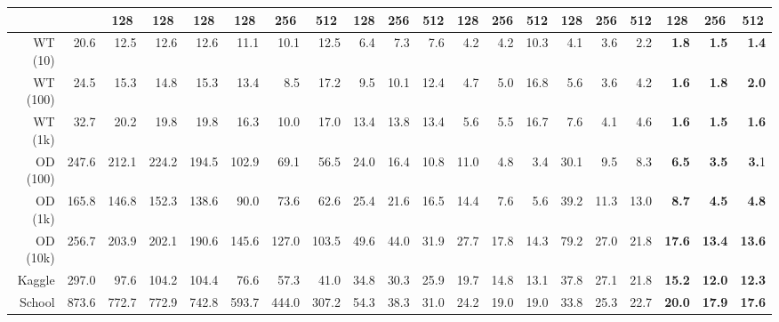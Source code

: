 \begin{table*}[]
\begin{tabular}{r|r|r|r|r|rrr|rrr|rrr|rrr|rrr}
&&\multicolumn{1}{c|}{\textbf{128}}&\multicolumn{1}{c|}{\textbf{128}}&\multicolumn{1}{c|}{\textbf{128}}&\multicolumn{1}{c}{\textbf{128}}&\multicolumn{1}{c}{\textbf{256}}&\multicolumn{1}{c|}{\textbf{512}}&\multicolumn{1}{c}{\textbf{128}}&\multicolumn{1}{c}{\textbf{256}}&\multicolumn{1}{c|}{\textbf{512}}&\multicolumn{1}{c}{\textbf{128}}&\multicolumn{1}{c}{\textbf{256}}&\multicolumn{1}{c|}{\textbf{512}}&\multicolumn{1}{c}{\textbf{128}}&\multicolumn{1}{c}{\textbf{256}}&\multicolumn{1}{c|}{\textbf{512}}&\multicolumn{1}{c}{\textbf{128}}&\multicolumn{1}{c}{\textbf{256}}&\multicolumn{1}{c}{\textbf{512}}\\
\toprule
WT (10) & 20.6 & 12.5 & 12.6 & 12.6 & 11.1 & 10.1 & \colorbox[HTML]{A2EDFF}{12.5} & 6.4 & \colorbox[HTML]{A2EDFF}{7.3} & \colorbox[HTML]{A2EDFF}{7.6} & 4.2 & 4.2 & \colorbox[HTML]{A2EDFF}{10.3} & 4.1 & 3.6 & 2.2 & \textbf{1.8} & \textbf{1.5} & \textbf{1.4} \\
WT (100) & 24.5 & 15.3 & 14.8 & 15.3 & 13.4 & 8.5 & \colorbox[HTML]{A2EDFF}{17.2} & 9.5 & \colorbox[HTML]{A2EDFF}{10.1} & \colorbox[HTML]{A2EDFF}{12.4} & 4.7 & \colorbox[HTML]{A2EDFF}{5.0} & \colorbox[HTML]{A2EDFF}{16.8} & 5.6 & 3.6 & \colorbox[HTML]{A2EDFF}{4.2} & \textbf{1.6} & \colorbox[HTML]{A2EDFF}{\textbf{1.8}} & \colorbox[HTML]{A2EDFF}{\textbf{2.0}}\\
WT (1k) & 32.7 & 20.2 & 19.8 & 19.8 & 16.3 & 10.0 & \colorbox[HTML]{A2EDFF}{17.0} & 13.4 & \colorbox[HTML]{A2EDFF}{13.8} & 13.4 & 5.6 & 5.5 & \colorbox[HTML]{FFABA8}{16.7} & 7.6 & 4.1 & \colorbox[HTML]{A2EDFF}{4.6} & \textbf{1.6} & \textbf{1.5} & \colorbox[HTML]{FFABA8}{\textbf{1.6}}\\
\toprule
OD (100) & 247.6 & 212.1 & 224.2 & 194.5 & 102.9 & 69.1 & 56.5 & 24.0 & 16.4 & 10.8 & 11.0 & 4.8 & 3.4 & 30.1 & 9.5 & 8.3 & \textbf{6.5} & \textbf{3.5} & \textbf{3.}1\\
OD (1k) & 165.8 & 146.8 & 152.3 & 138.6 & 90.0 & 73.6 & 62.6 & 25.4 & 21.6 & 16.5 & 14.4 & 7.6 & 5.6 & 39.2 & 11.3 & \colorbox[HTML]{A2EDFF}{13.0} & \textbf{8.7} & \textbf{4.5} & \colorbox[HTML]{A2EDFF}{\textbf{4.8}}\\
OD (10k) & 256.7 & 203.9 & 202.1 & 190.6 & 145.6 & 127.0 & 103.5 & 49.6 & 44.0 & 31.9 & 27.7 & 17.8 & 14.3 & 79.2 & 27.0 & 21.8 & \textbf{17.6} & \textbf{13.4} & \colorbox[HTML]{A2EDFF}{\textbf{13.6}}\\
\toprule
Kaggle & 297.0 & 97.6 &104.2&104.4&{76.6}&57.3&41.0&34.8&30.3&25.9&19.7&14.8&13.1 & 37.8&27.1&21.8&\textbf{15.2}&\textbf{12.0}&{\textbf{12.3}}\\
\toprule
School & 873.6 & 772.7 & 772.9 & 742.8 & 593.7&444.0&307.2 & 54.3&38.3&31.0 & 24.2&19.0& 19.0 & 33.8&25.3&22.7 &\textbf{20.0}&\textbf{17.9}&\textbf{17.6}\\
\end{tabular}
\end{table*}